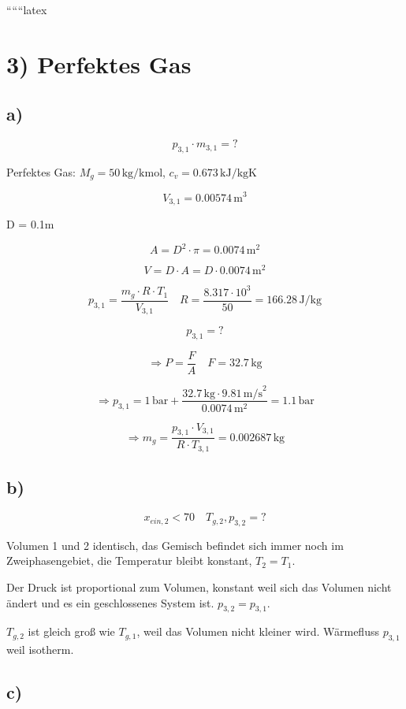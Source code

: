 
``````latex


\section*{3) Perfektes Gas}

\subsection*{a)}

\[
p_{3,1} \cdot m_{3,1} = ?
\]

Perfektes Gas: \( M_g = 50 \, \text{kg/kmol} \), \( c_v = 0.673 \, \text{kJ/kgK} \)

\[
V_{3,1} = 0.00574 \, \text{m}^3
\]

D = 0.1m

\[
A = D^2 \cdot \pi = 0.0074 \, \text{m}^2
\]

\[
V = D \cdot A = D \cdot 0.0074 \, \text{m}^2
\]

\[
p_{3,1} = \frac{m_g \cdot R \cdot T_1}{V_{3,1}} \quad R = \frac{8.317 \cdot 10^3}{50} = 166.28 \, \text{J/kg}
\]

\[
p_{3,1} = ?
\]

\[
\Rightarrow P = \frac{F}{A} \quad F = 32.7 \, \text{kg}
\]

\[
\Rightarrow p_{3,1} = 1 \, \text{bar} + \frac{32.7 \, \text{kg} \cdot 9.81 \, \text{m/s}^2}{0.0074 \, \text{m}^2} = 1.1 \, \text{bar}
\]

\[
\Rightarrow m_g = \frac{p_{3,1} \cdot V_{3,1}}{R \cdot T_{3,1}} = 0.002687 \, \text{kg}
\]

\subsection*{b)}

\[
x_{ein,2} < 70 \quad T_{g,2}, p_{3,2} = ?
\]

Volumen 1 und 2 identisch, das Gemisch befindet sich immer noch im Zweiphasengebiet, die Temperatur bleibt konstant, \( T_2 = T_1 \).

Der Druck ist proportional zum Volumen, konstant weil sich das Volumen nicht ändert und es ein geschlossenes System ist. \( p_{3,2} = p_{3,1} \).

\( T_{g,2} \) ist gleich groß wie \( T_{g,1} \), weil das Volumen nicht kleiner wird. Wärmefluss \( p_{3,1} \) weil isotherm.

\subsection*{c)}

